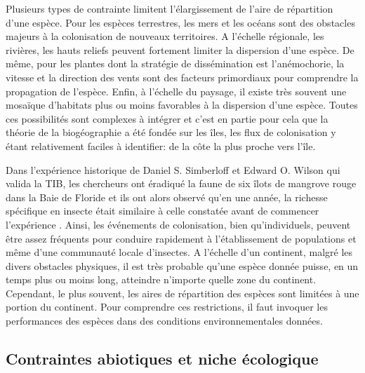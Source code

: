 Plusieurs types de contrainte limitent l'élargissement de l'aire de
répartition d'une espèce. Pour les espèces terrestres, les mers et les
océans sont des obstacles majeurs à la colonisation de nouveaux
territoires. A l'échelle régionale, les rivières, les hauts reliefs
peuvent fortement limiter la dispersion d'une espèce. De même, pour les
plantes dont la stratégie de dissémination est l'anémochorie, la vitesse
et la direction des vents sont des facteurs primordiaux pour comprendre
la propagation de l'espèce. Enfin, à l'échelle du paysage, il existe
très souvent une mosaïque d'habitats plus ou moins favorables à la
dispersion d'une espèce. Toutes ces possibilités sont complexes à
intégrer et c'est en partie pour cela que la théorie de la biogéographie
a été fondée sur les îles, les flux de colonisation y étant relativement
faciles à identifier: de la côte la plus proche vers l'île.

Dans l'expérience historique de Daniel S. Simberloff et Edward O. Wilson
qui valida la TIB, les chercheurs ont éradiqué la faune de six îlots de
mangrove rouge dans la Baie de Floride et ils ont alors observé qu'en
une année, la richesse spécifique en insecte était similaire à celle
constatée avant de commencer l'expérience \citep{Simberloff1969}. Ainsi,
les événements de colonisation, bien qu'individuels, peuvent être assez
fréquents pour conduire rapidement à l'établissement de populations et
même d'une communauté locale d'insectes. A l'échelle d'un continent,
malgré les divers obstacles physiques, il est très probable qu'une
espèce donnée puisse, en un temps plus ou moins long, atteindre
n'importe quelle zone du continent. Cependant, le plus souvent, les
aires de répartition des espèces sont limitées à une portion du
continent. Pour comprendre ces restrictions, il faut invoquer les
performances des espèces dans des conditions environnementales données.

\subsection*{Contraintes abiotiques et niche
écologique}\label{contraintes-abiotiques-et-niche-uxe9cologique}


